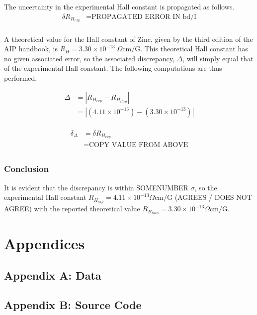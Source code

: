 \documentclass[a4paper]{article}
\begin{document}
The uncertainty in the experimental Hall constant is propagated as follows.
\begin{align*}
\delta R_{H_{exp}} &= \text{PROPAGATED ERROR IN bd/I} \\
\end{align*}

A theoretical value for the Hall constant of Zinc, given by the third
edition of the AIP handbook, is $R_H = 3.30 \times 10^{-13} \; \Omega 
\text{cm/G}$. This theoretical Hall constant has no given associated error, so the associated discrepancy, $\Delta$, will simply equal that of the experimental Hall constant. The following computations are thus performed.

\begin{align*}
\Delta &= | R_{H_{exp}} - R_{H_{theo}} | \\
	   &= | (4.11 \times 10^{-13}) - (3.30 \times 10^{-13}) | \\
\end{align*}

\begin{align*}
\delta_{\Delta} &= \delta R_{H_{exp}} \\
				&= \text{COPY VALUE FROM ABOVE} \\
\end{align*}

\subsubsection{Conclusion}
It is evident that the discrepancy is within SOMENUMBER $\sigma$, so the experimental Hall constant $R_{H_{exp}} = 4.11 \times 10^{-13} \Omega \text{cm/G}$ (AGREES / DOES NOT AGREE) with the reported theoretical value $R_{H_{theo}} = 3.30 \times 10^{-13} \Omega \text{cm/G}$.

\section{Appendices}

\subsection{Appendix A: Data}

\subsection{Appendix B: Source Code}
\end{document}
